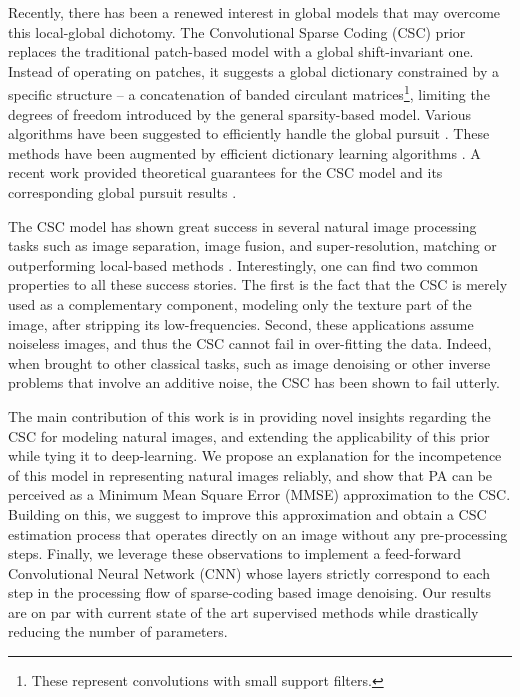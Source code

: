 \documentclass{article}
\begin{document}
Recently, there has been a renewed interest in global models that may overcome this local-global dichotomy. The Convolutional Sparse Coding (CSC) prior \cite{Grosse2007,szlam2010convolutional} replaces the traditional patch-based model with a global shift-invariant one. Instead of operating on patches, it suggests a global dictionary constrained by a specific structure -- a concatenation of banded circulant matrices\footnote{These represent convolutions with small support filters.}, limiting the degrees of freedom introduced by the general sparsity-based model. Various algorithms have been suggested to efficiently handle the global pursuit \cite{heide2015fast, silva2017fast, plaut2019greedy, zisselman2018local, wohlberg-2016-efficient}. These methods have been augmented by efficient dictionary learning algorithms \cite{papyan2017convolutional, zisselman2018local, garcia2018convolutional,chun2018convolutional}. A recent work provided theoretical guarantees for the CSC model and its corresponding global pursuit results \cite{papyan2017working}.

The CSC model has shown great success in several natural image processing tasks such as image separation, image fusion, and super-resolution, matching or outperforming local-based methods \cite{gu2015convolutional,papyan2017convolutional,liu2016image,rey2018variations,zisselman2018local}. Interestingly, one can find two common properties to all these success stories. The first is the fact that the CSC is merely used as a complementary component, modeling only the texture part of the image, after stripping its low-frequencies. Second, these applications assume noiseless images, and thus the CSC cannot fail in over-fitting the data. Indeed, when brought to other classical tasks, such as image denoising or other inverse problems that involve an additive noise, the CSC has been shown to fail utterly. 

The main contribution of this work is in providing novel insights regarding the CSC for modeling natural images, and extending the applicability of this prior while tying it to deep-learning. We propose an explanation for the incompetence of this model in representing natural images reliably, and show that PA can be perceived as a Minimum Mean Square Error (MMSE) approximation to the CSC. Building on this, we suggest to improve this approximation and obtain a CSC estimation process that operates directly on an image without any pre-processing steps. Finally, we leverage these observations to implement a feed-forward Convolutional Neural Network (CNN) whose layers strictly correspond to each step in the processing flow of sparse-coding based image denoising. Our results are on par with current state of the art supervised methods while drastically reducing the number of parameters.
\end{document}
